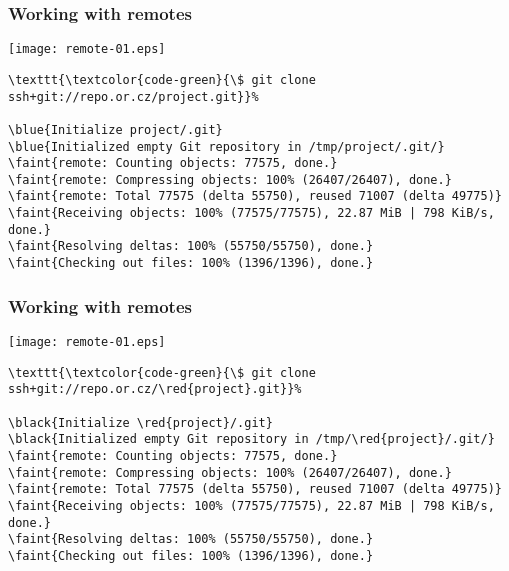 \documentclass[english]{beamer}
\newcommand{\CMD}[1]{%
\texttt{\textcolor{code-green}{#1}}%
}
\newcommand{\black}[1]{%
\textcolor{code-black}{#1}%
}
\newcommand{\faint}[1]{%
\textcolor{code-gray}{#1}%
}
\newcommand{\blue}[1]{%
\textcolor{code-blue}{#1}%
}
\newcommand{\red}[1]{%
\textcolor{code-red}{#1}%
}
\begin{document}
\begin{frame}[fragile]
\frametitle{Working with remotes}

\texttt{[image: remote-01.eps]}

{\tiny
\begin{Verbatim}[commandchars=\\\{\}]
\CMD{\$ git clone ssh+git://repo.or.cz/project.git}
\blue{Initialize project/.git}
\blue{Initialized empty Git repository in /tmp/project/.git/}
\faint{remote: Counting objects: 77575, done.}
\faint{remote: Compressing objects: 100% (26407/26407), done.}
\faint{remote: Total 77575 (delta 55750), reused 71007 (delta 49775)}
\faint{Receiving objects: 100% (77575/77575), 22.87 MiB | 798 KiB/s, done.}
\faint{Resolving deltas: 100% (55750/55750), done.}
\faint{Checking out files: 100% (1396/1396), done.}
\end{Verbatim}
}
\vspace{\textheight}
\end{frame}

\begin{frame}[fragile]
\frametitle{Working with remotes}

\texttt{[image: remote-01.eps]}

{\tiny
\begin{Verbatim}[commandchars=\\\{\}]
\CMD{\$ git clone ssh+git://repo.or.cz/\red{project}.git}
\black{Initialize \red{project}/.git}
\black{Initialized empty Git repository in /tmp/\red{project}/.git/}
\faint{remote: Counting objects: 77575, done.}
\faint{remote: Compressing objects: 100% (26407/26407), done.}
\faint{remote: Total 77575 (delta 55750), reused 71007 (delta 49775)}
\faint{Receiving objects: 100% (77575/77575), 22.87 MiB | 798 KiB/s, done.}
\faint{Resolving deltas: 100% (55750/55750), done.}
\faint{Checking out files: 100% (1396/1396), done.}
\end{Verbatim}
}
\vspace{\textheight}
\end{frame}
\end{document}
